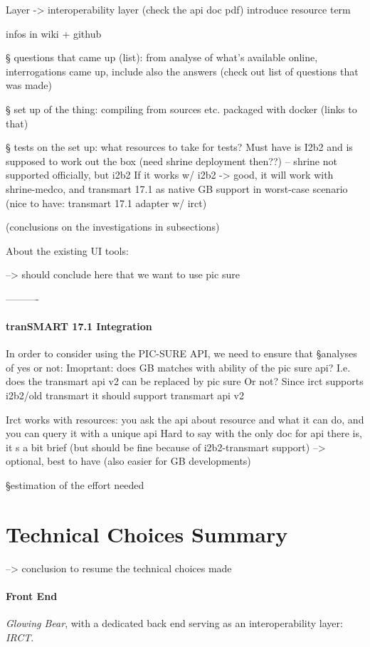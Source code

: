 Layer -> interoperability layer (check the api doc pdf)
introduce resource term

infos in wiki + github

§ questions that came up (list): from analyse of what’s available online, interrogations came up, include also the answers (check out list of questions that was made)

§ set up of the thing: compiling from sources etc. packaged with docker (links to that)

§ tests on the set up: what resources to take for tests? Must have is I2b2 and is supposed to work out the box (need shrine deployment then??) -- shrine not supported officially, but i2b2 
If it works w/ i2b2 -> good, it will work with shrine-medco, and transmart 17.1 as native GB support in worst-case scenario (nice to have: transmart 17.1 adapter w/ irct)

(conclusions on the investigations in subsections)


About the existing UI tools: 

--> should conclude here that we want to use pic sure

----------
\paragraph{tranSMART 17.1 Integration}
In order to consider using the PIC-SURE API, we need to ensure that 
§analyses of yes or not: Imoprtant: does GB matches with ability of the pic sure api? I.e. does the transmart api v2 can be replaced by pic sure 
Or not? Since irct supports i2b2/old transmart it should support transmart api v2

Irct works with resources: you ask the api about resource and what it can do, and you can query it with a unique api
Hard to say with the only doc for api there is, it s a bit brief (but should be fine because of i2b2-transmart support)
--> optional, best to have (also easier for GB developments)

§estimation of the effort needed



\section{Technical Choices Summary}
--> conclusion to resume the technical choices made


\paragraph{Front End}
\emph{Glowing Bear}, with a dedicated back end serving as an interoperability layer: \emph{IRCT}.

